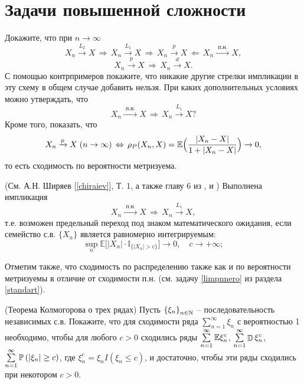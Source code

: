 
\section{Задачи повышенной сложности}
\label{hard}

\begin{problem}
Докажите, что при $n\to\infty$ 
$$
X_n\xrightarrow{L_2} X \,\Rightarrow\, X_n\xrightarrow{L_1}X \, \Rightarrow\, X_n\xrightarrow{p}X 
\, \Leftarrow\, X_n\xrightarrow{\text{ п.н. }}X , 
$$
$$
X_n\xrightarrow{p}X \, \Rightarrow\, X_n\xrightarrow{d}X . 
$$
С помощью контрпримеров покажите, что никакие другие стрелки импликации в эту схему в общем случае добавить нельзя. 
При каких дополнительных условиях можно утверждать, что 
$$
X_n\xrightarrow{\text{ п.н. }}X  \, \Rightarrow\, X_n\xrightarrow{L_1}X ?
$$
Кроме того, показать, что 
$$
X_n\xrightarrow{p} X \; (n\to\infty) \,\Leftrightarrow\, \rho_P(X_n,X)={\mathbb E}\Bigl( \frac{|X_n-X|}{1+|X_n-X|}\Bigr)
\xrightarrow{} 0 , 
$$
то есть сходимость по вероятности метризуема.
\end{problem}

\begin{remark} (См. А.Н. Ширяев [\ref{chiraiev}], Т. 1, а также главу 6 из \cite{Gupta}, и \cite{stoianov})
Выполнена импликация 
$$
X_n\xrightarrow{\text{ п.н. }}X  \, \Rightarrow\, X_n\xrightarrow{L_1}X , 
$$
т.е. возможен предельный переход под знаком математического ожидания, если семейство с.в. $\{ X_n\}$ является равномерно интегрируемым: 
$$
\sup\limits_n {\mathbb E}\bigl[ |X_n|\cdot {\mathbb I}_{\{ |X_n|>c\}} \bigr] \rightarrow 0, \quad c \to +\infty; 
$$

Отметим также, что сходимость по распределению также как и по вероятности метризуемы в отличие от сходимости п.н. (см. задачу \ref{limpnnero} из  раздела \ref{standart}). 

\end{remark}

\begin{problem}\Star(Теорема Колмогорова о трех рядах) 
Пусть $\left\{ {\xi _n } 
\right\}_{n\in {\rm N}} $ -- последовательность независимых с.в. 
Покажите, что для сходимости ряда $\sum\limits_{n=1}^\infty {\xi _n } $ с 
вероятностью 1 необходимо, чтобы для любого $c>0$ сходились ряды 
$\sum\limits_{n=1}^\infty {\ensuremath{\mathrm{{\mathbb E}}}\xi _n^c } $, $\sum\limits_{n=1}^\infty {\ensuremath{\mathop{\mathbb{D}}}\nolimits\xi 
_n^c } $, $\sum\limits_{n=1}^\infty {\ensuremath{\mathrm{{\mathbb P}}}\left( {\left| {\xi _n } \right|\ge c} 
\right)} $, где $\xi _n^c =\xi _n I\left( {\xi _n \le c} \right)$, и 
достаточно, чтобы эти ряды сходились при некотором $c>0$.
\end{problem}

